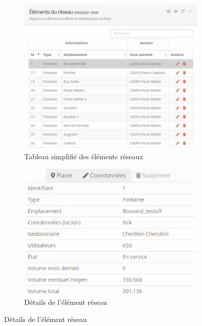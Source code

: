 \documentclass{EPL-master-thesis-covers-FR}
\begin{document}
				\begin{figure}[H]
					\begin{subfigure}[b]{0.5\textwidth}
  						\includegraphics[width=1\linewidth]{images/map_tab1}
  						\caption{Tableau simplifié des éléments réseaux}
					\end{subfigure}%
					\begin{subfigure}[b]{0.5\textwidth}
  						\includegraphics[width=1\linewidth]{images/map_tab2}
  						\caption{Détails de l'élément réseau}
					\end{subfigure}
				\end{figure}
				
\end{document}
